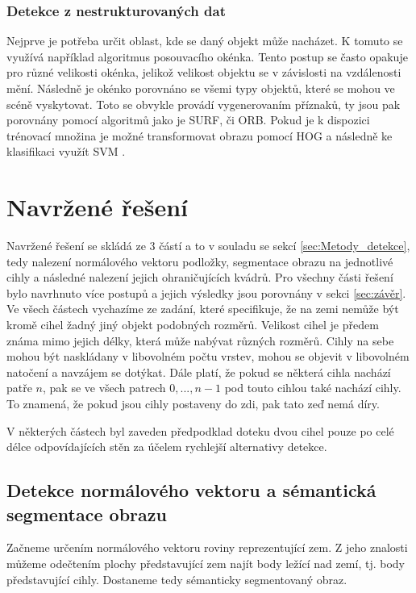 \documentclass[twoside]{ctuthesis}
\begin{document}
\subsection{Detekce z nestrukturovaných dat}
Nejprve je potřeba určit oblast, kde se daný objekt může nacházet. K tomuto se využívá například algoritmus posouvacího okénka. Tento postup se často opakuje pro různé velikosti okénka, jelikož velikost objektu se v závislosti na vzdálenosti mění. Následně je okénko porovnáno se všemi typy objektů, které se mohou ve scéně vyskytovat. Toto se obvykle provádí vygenerovaním příznaků, ty jsou pak porovnány pomocí algoritmů jako je SURF, či ORB. Pokud je k dispozici trénovací množina je možné transformovat obrazu pomocí HOG a následně ke klasifikaci využít SVM  \cite{lai2012detection, ward2019rgb}.

\chapter{Navržené řešení}
\label{sec:navrzene_reseni}
Navržené řešení se skládá ze 3 částí a to v souladu se sekcí \ref{sec:Metody_detekce}, tedy nalezení normálového vektoru podložky, segmentace obrazu na jednotlivé cihly a následné nalezení jejich ohraničujících kvádrů. Pro všechny části řešení bylo navrhnuto více postupů a jejich výsledky jsou porovnány v sekci \ref{sec:závěr}. Ve všech částech vychazíme ze zadání, které specifikuje, že na zemi nemůže být kromě cihel žadný jiný objekt podobných rozměrů. Velikost cihel je předem známa mimo jejich délky, která může nabývat různých rozměrů. Cihly na sebe mohou být naskládany v libovolném počtu vrstev, mohou se objevit v libovolném natočení a navzájem se dotýkat. Dále platí, že pokud se některá cihla nachází patře $n$, pak se ve všech patrech $0,...,n-1$ pod touto cihlou také nachází cihly. To znamená, že pokud jsou cihly postaveny do zdi, pak tato zeď nemá díry.

V některých částech byl zaveden předpodklad doteku dvou cihel pouze po celé délce odpovídajících stěn za účelem rychlejší alternativy detekce.
\section{Detekce normálového vektoru a sémantická segmentace obrazu}
\label{sec:normal_est}
Začneme určením normálového vektoru roviny reprezentující zem. Z jeho znalosti můžeme odečtením plochy představující zem najít body ležící nad zemí, tj. body představující cihly. Dostaneme tedy sémanticky segmentovaný obraz.
\end{document}
